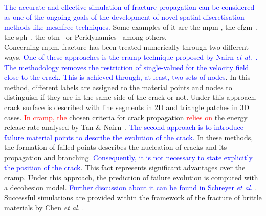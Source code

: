 \documentclass[preprint,12pt,a4paper]{elsarticle}
\begin{document}
\textcolor{blue}{The accurate and effective simulation of fracture propagation can be considered as one of the ongoing goals of the development of novel spatial discretisation methods like meshfree techniques.} Some examples of it are the \acrfull{mpm} \cite{Schreyer_2002,Nairn_2003,NAIRN_2018}, the
\acrfull{efgm}~\cite{BELYTSCHKO_1995b,BELYTSCHKO_2000}, the
\acrfull{sph}~\cite{Wang_2020,Wang_2019}, the \acrfull{otm}~\cite{Pandolfi_2013,Li_2015} or Peridynamics~\cite{HA_2011,RABCZUK_2017} among others.\\
Concerning \acrshort{mpm}, fracture has been treated numerically through two different ways. \textcolor{blue}{One of these approaches is the \acrshort{cramp} technique proposed by Nairn {\it et al.}~\cite{Nairn_2003}. The methodology removes the restriction of single-valued for the velocity field close to the crack. This is achieved through, at least, two sets of nodes}. In this method, different labels are assigned to the material points and nodes to distinguish if they are in the same side of the crack or not. Under this approach, crack surface is described with line segments in 2D and triangle patches in 3D cases. \textcolor{red}{In \acrshort{cramp}, the} chosen criteria for crack propagation \textcolor{red}{relies on} the energy release rate analysed by Tan \& Nairn~\cite{Nairn_2002}. \textcolor{blue}{The second approach is to introduce failure material points to describe the evolution of the crack.} In these methods, the formation of failed points describes the nucleation of cracks and its propagation and branching. \textcolor{blue}{Consequently, it is not necessary to state explicitly the position of the crack}. This fact represents significant advantages over the \acrshort{cramp}. Under this approach, the prediction of failure evolution is computed with a decohesion model. \textcolor{blue}{Further discussion about it can be found in Schreyer {\it et al.}\cite{Schreyer_2002}} . Successful simulations are provided within the framework of the fracture of brittle materials by Chen {\it et al.} \cite{Chen_2002}.\\
\end{document}
